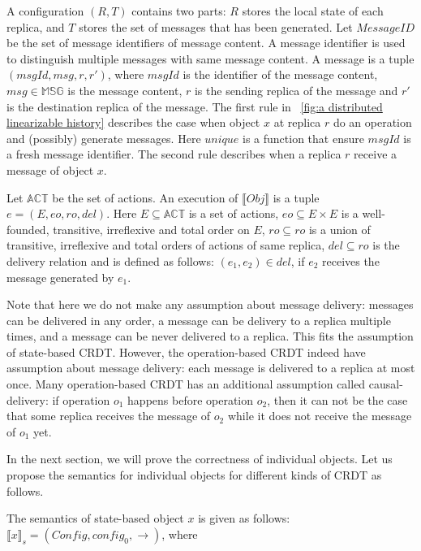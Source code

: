 A configuration $(R,T)$ contains two parts: $R$ stores the local state of each replica, and $T$ stores the set of messages that has been generated. Let $\mathit{MessageID}$ be the set of message identifiers of message content. A message identifier is used to distinguish multiple messages with same message content. A message is a tuple $(\mathit{msgId},\mathit{msg},r,r')$, where $\mathit{msgId}$ is the identifier of the message content, $\mathit{msg} \in \mathbb{MSG}$ is the message content, $r$ is the sending replica of the message and $r'$ is the destination replica of the message. The first rule in \figurename~\ref{fig:a distributed linearizable history} describes the case when object $x$ at replica $r$ do an operation and (possibly) generate messages. Here $\mathit{unique}$ is a function that ensure $\mathit{msgId}$ is a fresh message identifier. The second rule describes when a replica $r$ receive a message of object $x$.


Let $\mathbb{ACT}$ be the set of actions. An execution of $\llbracket \mathit{Obj} \rrbracket$ is a tuple $e = (E,\mathit{eo},\mathit{ro},\mathit{del})$. Here $E \subseteq \mathbb{ACT}$ is a set of actions, $\mathit{eo} \subseteq E \times E$ is a well-founded, transitive, irreflexive and total order on $E$, $\mathit{ro} \subseteq \mathit{ro}$ is a union of transitive, irreflexive and total orders of actions of same replica, $\mathit{del} \subseteq \mathit{ro}$ is the delivery relation and is defined as follows: $(e_1,e_2) \in \mathit{del}$, if $e_2$ receives the message generated by $e_1$.

Note that here we do not make any assumption about message delivery: messages can be delivered in any order, a message can be delivery to a replica multiple times, and a message can be never delivered to a replica. This fits the assumption of state-based CRDT. However, the operation-based CRDT indeed have assumption about message delivery: each message is delivered to a replica at most once. Many operation-based CRDT has an additional assumption called causal-delivery: if operation $o_1$ happens before operation $o_2$, then it can not be the case that some replica receives the message of $o_2$ while it does not receive the message of $o_1$ yet.

In the next section, we will prove the correctness of individual objects. Let us propose the semantics for individual objects for different kinds of CRDT as follows.

The semantics of state-based object $x$ is given as follows: $\llbracket x \rrbracket_{s} = (\mathit{Config},\mathit{config}_0,\rightarrow)$, where

